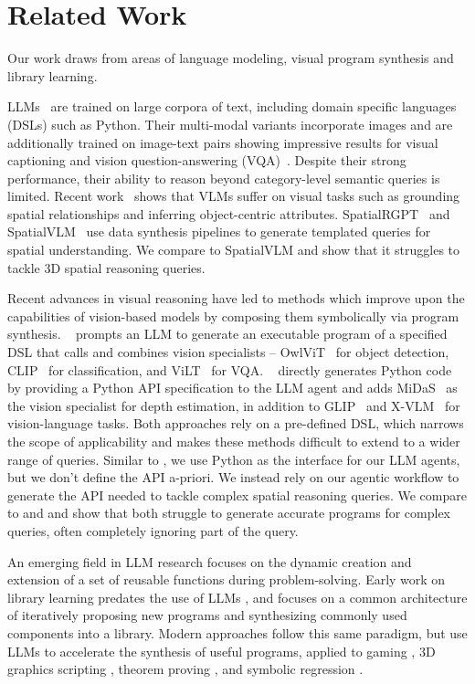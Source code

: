 \section{Related Work}
\label{sec:related}

Our work draws from areas of language modeling, visual program synthesis and library learning. 

LLMs~\cite{gpt4,gemini,llama3,claude} are trained on large corpora of text, including domain specific languages (DSLs) such as Python. Their multi-modal variants incorporate images and are additionally trained on image-text pairs showing impressive results for visual captioning and vision question-answering (VQA)~\cite{vqa}. 
Despite their strong performance, their ability to reason beyond category-level semantic queries is limited.
Recent work~\cite{cambrian1,whatsup} shows that VLMs suffer on visual tasks such as grounding spatial relationships and inferring object-centric attributes. SpatialRGPT~\cite{spatialrgpt} and SpatialVLM~\cite{spatial} use data synthesis pipelines to generate templated queries for spatial understanding. We compare to SpatialVLM and show that it struggles to tackle 3D spatial reasoning queries.

Recent advances in visual reasoning have led to methods which improve upon the capabilities of vision-based models by composing them symbolically via program synthesis. 
\visprog~\cite{visprog} prompts an LLM to generate an executable program of a specified DSL that calls and combines vision specialists -- OwlViT~\cite{owlvit} for object detection, CLIP~\cite{clip} for classification, and ViLT~\cite{vilt} for VQA.
\viper~\cite{vipergpt} directly generates Python code by providing a Python API specification to the LLM agent and adds MiDaS~\cite{midas} as the vision specialist for depth estimation, in addition to GLIP~\cite{glip} and X-VLM~\cite{x-vlm} for vision-language tasks.
Both approaches rely on a pre-defined DSL, which narrows the scope of applicability and makes these methods difficult to extend to a wider range of queries.
Similar to \viper, we use Python as the interface for our LLM agents, but we don't define the API a-priori.
We instead rely on our agentic workflow to generate the API needed to tackle complex spatial reasoning queries.
We compare to \viper and \visprog and show that both struggle to generate accurate programs for complex queries, often completely ignoring part of the query. 

An emerging field in LLM research focuses on the dynamic creation and extension of a set of reusable functions during problem-solving. 
Early work on library learning predates the use of LLMs \cite{ellis2023dreamcoder,valkov2018houdini,lake2015human},
and focuses on a common architecture of iteratively proposing new programs and synthesizing commonly used components into a library.
Modern approaches follow this same paradigm, but use LLMs to accelerate the synthesis of useful programs, applied to gaming \cite{wang2023voyager}, 3D graphics scripting \cite{hu2024scenecraft}, theorem proving \cite{thakur2024context}, and symbolic regression \cite{grayeli2024symbolic}. 

